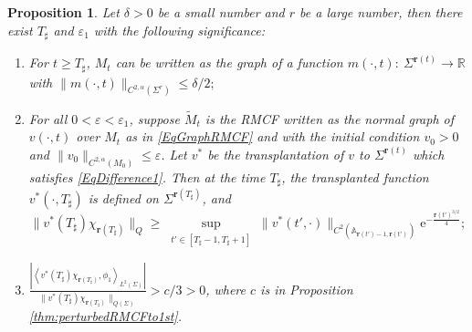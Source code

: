 \documentclass[12pt]{amsart}
\numberwithin{equation}{section}
\newtheorem{proposition}[theorem]{Proposition}
\numberwithin{equation}{section}
\newcommand{\eps}{\varepsilon}
\newcommand{\dt}{\delta}
\newcommand{\al}{\alpha}
\newcommand{\br}{\mathbf{r}}
\newcommand{\R}{\mathbb{R}}
\begin{document}
	\begin{proposition} \label{LmT} Let $\dt>0$ be a small number and $r$ be a large number, then there exist $T_\sharp$ and $\eps_1$ with the following significance:  
		\begin{enumerate}
			\item For $t\geq T_\sharp$, $M_{t}$ can be written as the graph of a function $m(\cdot,t):\ \Sigma^{\mathbf r(t)}\to \R$ with $\|m(\cdot,t)\|_{C^{2,\al}(\Sigma^r)}\leq \dt/2;$ 
			\item For all $0<\eps<\eps_1$, suppose $\widetilde M_t$  is the RMCF written as the normal graph of $v(\cdot,t)$ over $M_t$ as in \eqref{EqGraphRMCF} and with the initial condition $v_0>0$ and $\|v_0\|_{C^{2,\al}(M_0)}\leq \eps$. Let $v^*$ be the transplantation of $v$ to $\Sigma^{\mathbf{r}(t)}$ which satisfies \eqref{EqDifference1}. Then at the time $T_\sharp$, the transplanted function $v^*(\cdot,T_\sharp)$ is defined on $\Sigma^{\mathbf{r}(T_\sharp)}$, and
			$$\|v^*(T_\sharp)\chi_{\mathbf{r}({T_\sharp})}\|_Q\geq  \sup_{\substack{ t'\in[T_{\sharp}-1,T_{\sharp}+1]}}
			\|v^*(t',\cdot)\|_{C^2(\mathbb A_{\mathbf r({t'})-1,\mathbf r({t'})})} \mathrm{e}^{-\frac{{\mathbf r({t'})^{3/2}}}{4}}; $$
			\item $\frac{\left|\left\langle v^*(T_\sharp)\chi_{\br(T_\sharp)},\phi_1\right\rangle_{L^2(\Sigma)}\right|}{\|v^*(T_\sharp)\chi_{\br(T_\sharp)}\|_{Q(\Sigma)}}>c/3>0$, where $c$ is in Proposition \ref{thm:perturbedRMCFto1st}. 
		\end{enumerate}
	\end{proposition}
\end{document}
